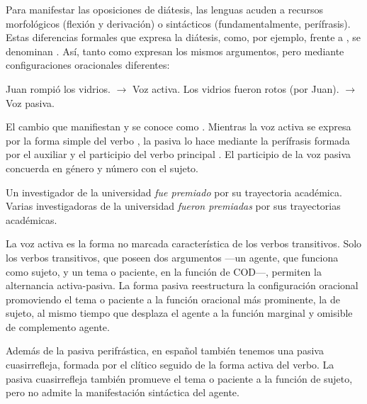 Para manifestar las oposiciones de diátesis, las lenguas acuden a recursos
morfológicos (flexión y derivación) o sintácticos (fundamentalmente,
perífrasis). Estas diferencias formales que expresa la diátesis, como, por
ejemplo,  frente a , se denominan
 \parencite{rae2025}. Así, tanto  como
 expresan los mismos argumentos, pero mediante
configuraciones oracionales diferentes:

\begin{exe}
  \ex
    \begin{xlist}
      \ex\label{ex:11-vidrios-a} Juan rompió los vidrios. $\rightarrow$ Voz
          activa.
      \ex\label{ex:11-vidrios-b} Los vidrios fueron rotos (por Juan).
          $\rightarrow$ Voz pasiva.
    \end{xlist}
\end{exe}

El cambio que manifiestan  y  se
conoce como . Mientras la voz activa se
expresa por la forma simple del verbo , la pasiva lo hace
mediante la perífrasis formada por el auxiliar  y el participio del
verbo principal . El participio de la voz pasiva
concuerda en género y número con el sujeto.

\begin{exe}
  \ex
    \begin{xlist}
      \ex Un investigador de la universidad \textit{fue premiado} por su
          trayectoria académica.
      \ex Varias investigadoras de la universidad \textit{fueron premiadas} por
          sus trayectorias académicas.
    \end{xlist}
\end{exe}

La voz activa es la forma no marcada característica de los verbos transitivos.
Solo los verbos transitivos, que poseen dos argumentos ---un agente, que funciona
como sujeto, y un tema o paciente, en la función de COD---, permiten la
alternancia activa-pasiva. La forma pasiva reestructura la configuración
oracional promoviendo el tema o paciente a la función oracional más prominente,
la de sujeto, al mismo tiempo que desplaza el agente a la función marginal y
omisible de complemento agente.

Además de la pasiva perifrástica, en español también tenemos una pasiva
cuasirrefleja, formada por el clítico  seguido de la forma activa del
verbo. La pasiva cuasirrefleja también promueve el tema o paciente a la función
de sujeto, pero no admite la manifestación sintáctica del agente.

